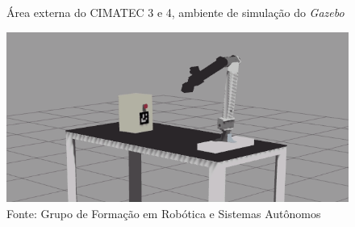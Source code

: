 \begin{figure}[H]
    \caption{Área externa do CIMATEC 3 e 4, ambiente de simulação do \textit{Gazebo}}
    \centering
    \includegraphics[width= \textwidth]{Figures/manipulador_simulacao.png}
    \caption*{Fonte: Grupo de Formação em Robótica e Sistemas Autônomos}
    \label{fig:manipulador_simulacao}
\end{figure}
